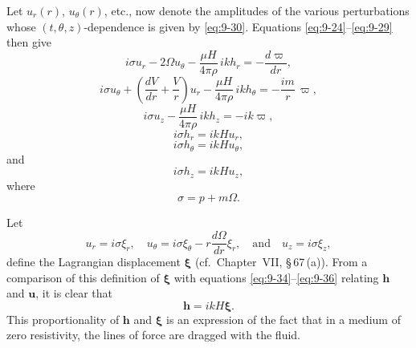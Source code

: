 Let $u_r(r)$, $u_\theta(r)$, etc., now denote the amplitudes of the various perturbations whose $(t,\theta,z)$-dependence is given by \eqref{eq:9-30}. Equations \eqref{eq:9-24}--\eqref{eq:9-29} then give
\begin{equation}
i\sigma u_r - 2\Omega u_\theta - \frac{\mu H}{4\pi\rho}\, ikh_r = -\frac{d\varpi}{dr}, \label{eq:9-31}
\end{equation}
\begin{equation}
i\sigma u_\theta + \left(\frac{dV}{dr} + \frac{V}{r}\right) u_r - \frac{\mu H}{4\pi\rho}\, ikh_\theta = -\frac{im}{r}\,\varpi, \label{eq:9-32}
\end{equation}
\begin{equation}
i\sigma u_z - \frac{\mu H}{4\pi\rho}\, ikh_z = -ik\varpi, \label{eq:9-33}
\end{equation}
\begin{equation}
i\sigma h_r = ikH u_r, \label{eq:9-34}
\end{equation}
\begin{equation}
i\sigma h_\theta = ikH u_\theta, \label{eq:9-35}
\end{equation}
and
\begin{equation}
i\sigma h_z = ikH u_z, \label{eq:9-36}
\end{equation}
where
\begin{equation}
\sigma = p + m\Omega. \label{eq:9-37}
\end{equation}

Let
\begin{equation}
u_r = i\sigma\xi_r, \quad u_\theta = i\sigma\xi_\theta - r\frac{d\Omega}{dr}\xi_r, \quad \text{and} \quad u_z = i\sigma\xi_z, \label{eq:9-38}
\end{equation}
define the Lagrangian displacement $\boldsymbol{\xi}$ (cf.\ Chapter~VII, \S\,67\,(a)). From a comparison of this definition of $\boldsymbol{\xi}$ with equations \eqref{eq:9-34}--\eqref{eq:9-36} relating $\mathbf{h}$ and $\mathbf{u}$, it is clear that
\begin{equation}
\mathbf{h} = ikH\boldsymbol{\xi}. \label{eq:9-39}
\end{equation}
This proportionality of $\mathbf{h}$ and $\boldsymbol{\xi}$ is an expression of the fact that in a medium of zero resistivity, the lines of force are dragged with the fluid.


